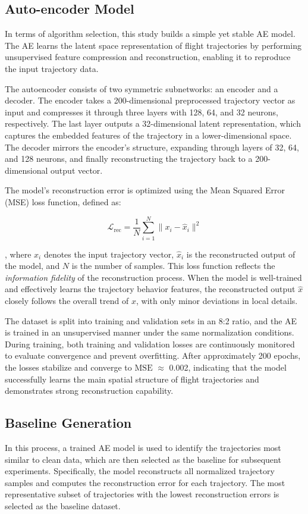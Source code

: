 \subsection{Auto-encoder Model}
In terms of algorithm selection, this study builds a simple yet stable AE model. The AE learns the latent space representation of flight trajectories by performing unsupervised feature compression and reconstruction, enabling it to reproduce the input trajectory data.

The autoencoder consists of two symmetric subnetworks: an encoder and a decoder. The encoder takes a 200-dimensional preprocessed trajectory vector as input and compresses it through three layers with 128, 64, and 32 neurons, respectively. The last layer outputs a 32-dimensional latent representation, which captures the embedded features of the trajectory in a lower-dimensional space. The decoder mirrors the encoder’s structure, expanding through layers of 32, 64, and 128 neurons, and finally reconstructing the trajectory back to a 200-dimensional output vector.

The model’s reconstruction error is optimized using the Mean Squared Error (MSE) loss function, defined as:

\[
\mathcal{L}_{\text{rec}} = \frac{1}{N} \sum_{i=1}^{N} \| x_i - \hat{x}_i \|^2
\]

, where \( x_i \) denotes the input trajectory vector, \( \hat{x}_i \) is the reconstructed output of the model, and \( N \) is the number of samples.
This loss function reflects the \textit{information fidelity} of the reconstruction process. When the model is well-trained and effectively learns the trajectory behavior features, the reconstructed output $\hat{x}$ closely follows the overall trend of $x$, with only minor deviations in local details.

The dataset is split into training and validation sets in an 8:2 ratio, and the AE is trained in an unsupervised manner under the same normalization conditions. During training, both training and validation losses are continuously monitored to evaluate convergence and prevent overfitting. After approximately 200 epochs, the losses stabilize and converge to $\mathrm{MSE}$ $\approx$ 0.002, indicating that the model successfully learns the main spatial structure of flight trajectories and demonstrates strong reconstruction capability.

\subsection{Baseline Generation}
In this process, a trained AE model is used to identify the trajectories most similar to clean data, which are then selected as the baseline for subsequent experiments. Specifically, the model reconstructs all normalized trajectory samples and computes the reconstruction error for each trajectory. The most representative subset of trajectories with the lowest reconstruction errors is selected as the baseline dataset.

